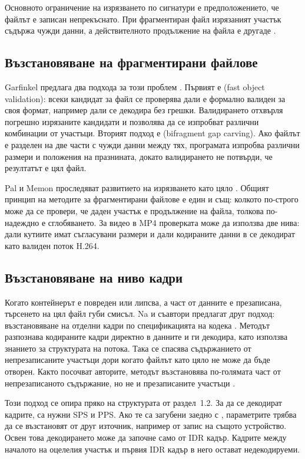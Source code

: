 Основното ограничение на изрязването по сигнатури е предположението, че файлът е записан
непрекъснато. При фрагментиран файл изрязаният участък съдържа чужди данни, а
действителното продължение на файла е другаде \cite{garfinkel2007}.

\subsection{Възстановяване на фрагментирани файлове}

Garfinkel предлага два подхода за този проблем \cite{garfinkel2007}. Първият е
 (fast object validation): всеки кандидат за файл се
проверява дали е формално валиден за своя формат, например дали се декодира без грешки.
Валидирането отхвърля погрешно изрязаните кандидати и позволява да се изпробват различни
комбинации от участъци. Вторият подход е  (bifragment gap carving). Ако файлът е разделен на две части с чужди данни
между тях, програмата изпробва различни размери и положения на празнината, докато
валидирането не потвърди, че резултатът е цял файл.

Pal и Memon проследяват развитието на изрязването като цяло \cite{pal2009}. Общият
принцип на методите за фрагментирани файлове е един и същ: колкото по-строго може да се провери, че
даден участък е продължение на файла, толкова по-надеждно е сглобяването. За видео в
MP4 проверката може да използва две нива: дали кутиите имат съгласувани размери и дали
кодираните данни в  се декодират като валиден поток H.264.

\subsection{Възстановяване на ниво кадри}

Когато контейнерът е повреден или липсва, а част от данните е презаписана, търсенето на
цял файл губи смисъл. Na и съавтори предлагат друг подход: възстановяване на отделни
кадри по спецификацията на кодека \cite{na2014}. Методът разпознава кодираните кадри
директно в данните и ги декодира, като използва знанието за структурата на потока. Така
се спасява съдържанието от непрезаписаните участъци дори когато файлът като цяло не
може да бъде отворен. Както посочват авторите, методът възстановява по-голямата част от
непрезаписаното съдържание, но не и презаписаните участъци \cite{na2014}.

Този подход се опира пряко на структурата от раздел~1.2. За да се декодират кадрите, са
нужни SPS и PPS. Ако те са загубени заедно с , параметрите трябва да се
възстановят от друг източник, например от запис на същото устройство. Освен това
декодирането може да започне само от IDR кадър. Кадрите между началото на оцелелия
участък и първия IDR кадър в него остават недекодируеми.

